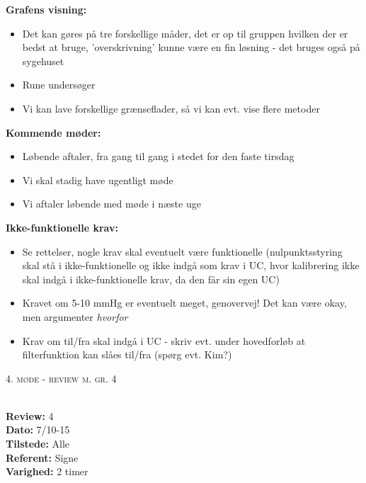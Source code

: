 \documentclass[a4paper,11pt,oneside]{memoir}
\begin{document}
\textbf{Grafens visning:}
\begin{itemize}
\item Det kan gøres på tre forskellige måder, det er op til gruppen hvilken der er bedst at bruge, 'overskrivning' kunne være en fin løsning - det bruges også på sygehuset
\item Rune undersøger 
\item Vi kan lave forskellige grænseflader, så vi kan evt. vise flere metoder
\end{itemize}

\textbf{Kommende møder:}
\begin{itemize}
\item Løbende aftaler, fra gang til gang i stedet for den faste tirsdag
\item Vi skal stadig have ugentligt møde
\item Vi aftaler løbende med møde i næste uge
\end{itemize}

\textbf{Ikke-funktionelle krav:}
\begin{itemize}
\item Se rettelser, nogle krav skal eventuelt være funktionelle (nulpunktsstyring skal stå i ikke-funktionelle og ikke indgå som krav i UC, hvor kalibrering ikke skal indgå i ikke-funktionelle krav, da den får sin egen UC)
\item Kravet om 5-10 mmHg er eventuelt meget, genovervej! Det kan være okay, men argumenter \textit{hvorfor}
\item Krav om til/fra skal indgå i UC - skriv evt. under hovedforløb at filterfunktion kan slåes til/fra (spørg evt. Kim?) 
\end{itemize}

\newpage


\begin{center} 
\huge{\textsc{4. møde - review m. gr. 4}}
\end{center}

\textbf{ }
\\
\textbf{Review:} 4
\\
\textbf{Dato:} 7/10-15
\\
\textbf{Tilstede:} Alle
\\
\textbf{Referent:} Signe
\\
\textbf{Varighed:} 2 timer
\\
\end{document}
